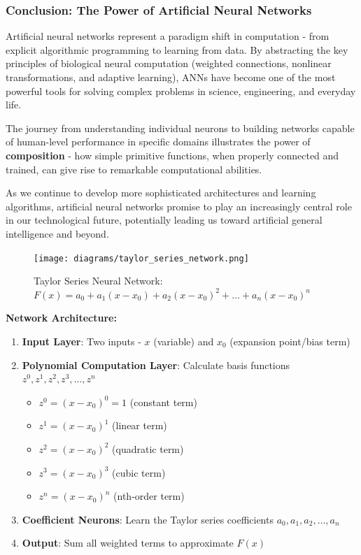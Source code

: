 \subsubsection{Conclusion: The Power of Artificial Neural Networks}
\label{subsubsec:conclusion-ann-power}

Artificial neural networks represent a paradigm shift in computation - from explicit algorithmic programming to learning from data. By abstracting the key principles of biological neural computation (weighted connections, nonlinear transformations, and adaptive learning), ANNs have become one of the most powerful tools for solving complex problems in science, engineering, and everyday life.

The journey from understanding individual neurons to building networks capable of human-level performance in specific domains illustrates the power of \textbf{composition} - how simple primitive functions, when properly connected and trained, can give rise to remarkable computational abilities.

As we continue to develop more sophisticated architectures and learning algorithms, artificial neural networks promise to play an increasingly central role in our technological future, potentially leading us toward artificial general intelligence and beyond.

\begin{figure}[h!]
\centering
\texttt{[image: diagrams/taylor\_series\_network.png]}
\caption{Taylor Series Neural Network: $F(x) = a_0 + a_1(x - x_0) + a_2(x - x_0)^2 + \ldots + a_n(x - x_0)^n$}
\label{fig:taylor-series-network}
\end{figure}

\textbf{Network Architecture:}

\begin{enumerate}
\item \textbf{Input Layer}: Two inputs - $x$ (variable) and $x_0$ (expansion point/bias term)
\item \textbf{Polynomial Computation Layer}: Calculate basis functions $z^0, z^1, z^2, z^3, \ldots, z^n$
\begin{itemize}
\item $z^0 = (x-x_0)^0 = 1$ (constant term)
\item $z^1 = (x-x_0)^1$ (linear term)
\item $z^2 = (x-x_0)^2$ (quadratic term)
\item $z^3 = (x-x_0)^3$ (cubic term)
\item $z^n = (x-x_0)^n$ (nth-order term)
\end{itemize}
\item \textbf{Coefficient Neurons}: Learn the Taylor series coefficients $a_0, a_1, a_2, \ldots, a_n$
\item \textbf{Output}: Sum all weighted terms to approximate $F(x)$
\end{enumerate}


